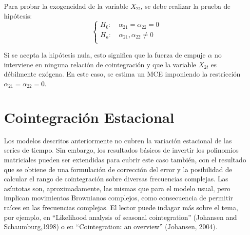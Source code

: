 Para probar la exogeneidad de la variable $X_{2t}$, se debe realizar la prueba de hip\'{o}tesis:
\[
\left\{ {\begin{array}{l}
 H_{0}:\quad \alpha_{21}=\alpha_{22}=0 \\ 
 H_{a}:\quad \alpha_{21},\alpha_{22}\ne 0\\ 
 \end{array}} \right.
\]

Si se acepta la hip\'{o}tesis nula, esto significa que la fuerza de empuje $\alpha $ no interviene en ninguna relaci\'{o}n de cointegraci\'{o}n y que la variable $X_{2t}$ es d\'{e}bilmente ex\'{o}gena. En este caso, se estima un MCE imponiendo la restricci\'{o}n $\alpha_{21}=\alpha_{22}=0$.

\section{Cointegraci\'{o}n Estacional}
Los modelos descritos anteriormente no cubren la variaci\'{o}n estacional de las series de tiempo. Sin embargo, los resultados b\'{a}sicos de invertir los polinomios matriciales pueden ser extendidas para cubrir este caso tambi\'{e}n, con el resultado que se obtiene de una formulaci\'{o}n de correcci\'{o}n del error y la posibilidad de calcular el rango de cointegraci\'{o}n sobre diversas frecuencias complejas. Las as\'{i}ntotas son, aproximadamente, las mismas que para el modelo usual, pero implican movimientos Brownianos complejos, como consecuencia de permitir ra\'{i}ces en las frecuencias complejas. El lector puede indagar m\'{a}s sobre el tema, por ejemplo, en ``Likelihood analysis of seasonal cointegration'' (Johansen and Schaumburg,1998) o en ``Cointegration: an overview'' (Johansen, 2004).
